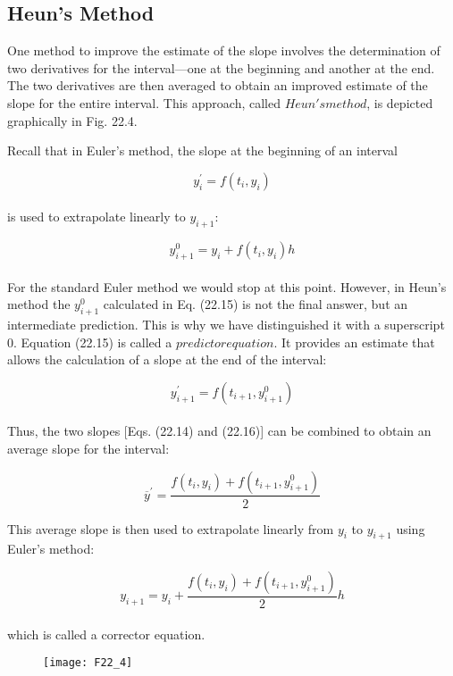 \documentclass[../main.tex]{subfiles}
\begin{document}
\subsection{Heun's Method}
One method to improve the estimate of the slope involves the determination of two derivatives for the interval—one at the beginning and another at the end. The two derivatives are
then averaged to obtain an improved estimate of the slope for the entire interval. This approach, called $Heun's method$, is depicted graphically in Fig. 22.4.

Recall that in Euler's method, the slope at the beginning of an interval

\begin{equation}
\tag{22.14}
y^{'}_{i} = f(t_{i},y_{i})
\end{equation}\\
is used to extrapolate linearly to $y_{i+1}$:

\begin{equation}
\tag{22.15}
y^{0}_{i+1} = y_{i} + f( t_{i}, y_{i} )h
\end{equation}\\
For the standard Euler method we would stop at this point. However, in Heun's method the $y^{0}_{i+1}$ calculated in Eq. (22.15) is not the final answer, but an intermediate prediction. This is
why we have distinguished it with a superscript 0. Equation (22.15) is called a $predictor equation$. It provides an estimate that allows the calculation of a slope at the end of the interval:

\begin{equation}
\tag{22.16}
y^{'}_{i+1} = f( t_{i+1},y^{0}_{i+1})
\end{equation}\\
Thus, the two slopes [Eqs. (22.14) and (22.16)] can be combined to obtain an average slope
for the interval:


$$\overline{y}^{'} = \dfrac{f(t_{i},y_{i} ) + f(t_{i+1}, y^{0}_{i+1}) }{2}$$


This average slope is then used to extrapolate linearly from $y_{i}$ to $y_{i+1}$ using Euler's
method:

\begin{equation}
\tag{22.17}
y_{i+1} = y_{i} + \dfrac{f(t_{i},y_{i} ) + f(t_{i+1}, y^{0}_{i+1}) }{2}h
\end{equation}\\
which is called a corrector equation.\\
\begin{figure}[hbt!]
	\texttt{[image: F22\_4]}
	\label{F22.4}
\end{figure}\\
\end{document}
